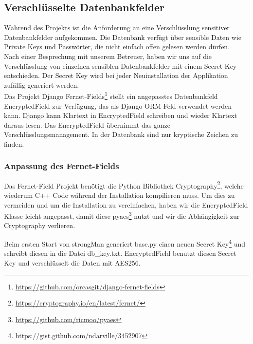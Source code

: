 \subsection{Verschlüsselte Datenbankfelder}
Während des Projekts ist die Anforderung an eine Verschlüsslung sensitiver Datenbankfelder aufgekommen. Die Datenbank verfügt über sensible Daten wie Private Keys und Passwörter, die nicht einfach offen gelesen werden dürfen.\\


Nach einer Besprechung mit unserem Betreuer, haben wir uns auf die Verschlüsslung von einzelnen sensiblen Datenbankfelder mit einem Secret Key entschieden. Der Secret Key wird bei jeder Neuinstallation der Applikation zufällig generiert werden.\\
Das Projekt  Django Fernet-Fields\footnote{\url{https://github.com/orcasgit/django-fernet-fields}} stellt ein angepasstes Datenbankfeld EncryptedField zur Verfügung, das als Django ORM Feld verwendet werden kann. Django kann Klartext in EncryptedField schreiben und wieder Klartext daraus lesen. Das EncryptedField übernimmt das ganze Verschlüsslungsmanagement. In der Datenbank sind nur kryptische Zeichen zu finden.

\subsubsection{Anpassung des Fernet-Fields}
Das Fernet-Field Projekt benötigt die Python Bibliothek Cryptography\footnote{\url{https://cryptography.io/en/latest/fernet/}}, welche wiederum C++ Code während der Installation kompilieren muss. Um dies zu vermeiden und um die Installation zu vereinfachen, haben wir die EncryptedField Klasse leicht angepasst, damit diese pyaes\footnote{\url{https://github.com/ricmoo/pyaes}} nutzt und wir die Abhängigkeit zur Cryptography verlieren.

Beim ersten Start von strongMan generiert base.py einen neuen Secret Key\footnote{https://gist.github.com/ndarville/3452907} und schreibt diesen in die Datei db\_key.txt.
EncryptedField benutzt diesen Secret Key und verschlüsselt die Daten mit AES256.
